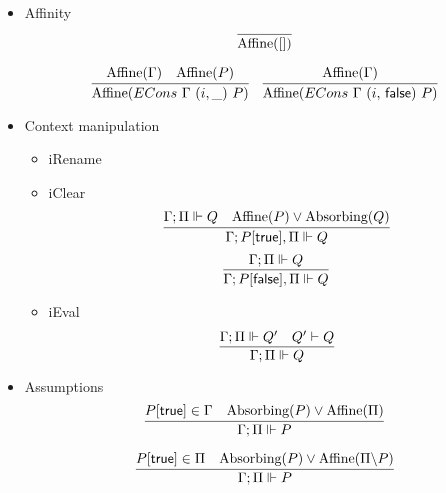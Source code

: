\begin{itemize}
\item Affinity
  \[
  \infer{\Affine{[]}}{}
  \]

  \begin{equation*}
  \infer{\Affine{ECons\ \Gamma\ (i,\_)\ P}}
        {\Affine{\Gamma} &
         \Affine{P}
       }
  \quad
  \infer{\Affine{ECons\ \Gamma\ (i,\, \false)\ P}}
        {\Affine{\Gamma}}
  \end{equation*}
\item Context manipulation
  \begin{itemize}
  \item iRename
  \item iClear
    \[
    \infer{\entails {\IntuD} {P[\true], \SpatD} {Q}}
          {\entailsD Q &
           \Affine{P} \vee \Absorbing{Q}}
    \]
    \[
    \infer{\entails {\IntuD} {P[\false], \SpatD} {Q}}
          {\entailsD Q}
    \]
  \item iEval
    \[
    \infer{\entailsD Q}
          {\entailsD Q' &
           Q' \vdash Q
          }
    \]
  \end{itemize}
\item Assumptions
  \[
  \infer{\entailsD P}
        {P[\true] \in \IntuD &
         \Absorbing{P} \vee \Affine{\SpatD}}
  \]

 \[
  \infer{\entailsD P}
        {P[\true] \in \SpatD &
         \Absorbing{P} \vee \Affine{\SpatD \backslash P}}
 \]


\end{itemize}
